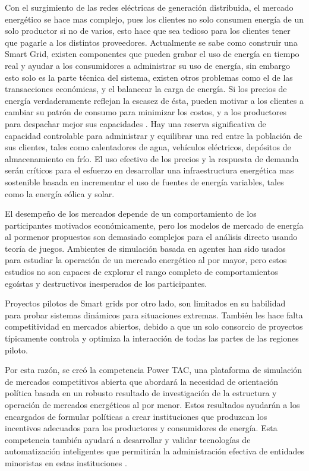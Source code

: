 Con el surgimiento de las redes eléctricas de generación distribuida, el mercado energético se hace mas complejo, pues los clientes no solo consumen energía de un solo productor si no de varios, esto hace que sea tedioso para los clientes tener que pagarle a los distintos proveedores.
Actualmente se sabe como construir una Smart Grid, existen componentes que pueden grabar el uso de energía en tiempo real y ayudar a los consumidores a administrar su uso de energía, sin embargo esto solo es la parte técnica del sistema, existen otros problemas como el de las transacciones económicas, y el balancear la carga de energía.
Si los precios de energía verdaderamente reflejan la escasez de ésta, pueden motivar a los clientes a cambiar su patrón de consumo para minimizar los costos, y a los productores para despachar mejor sus capacidades \cite{RetailElectricityCompetition}.
Hay una reserva significativa de capacidad controlable para administrar y equilibrar una red entre la población de sus clientes, tales como calentadores de agua, vehículos eléctricos, depósitos de almacenamiento en frío. 
El uso efectivo de los precios y la respuesta de demanda serán críticos para el esfuerzo en desarrollar una infraestructura energética mas sostenible basada en incrementar el uso de fuentes de energía variables, tales como la energía eólica y solar.

El desempeño de los mercados depende de un comportamiento de los participantes motivados económicamente, pero los modelos de mercado de energía al pormenor propuestos son demasiado complejos para el análisis directo usando teoría de juegos.
Ambientes de simulación basada en agentes han sido usados para estudiar la operación de un mercado energético al por mayor, pero estos estudios no son capaces de explorar el rango completo de comportamientos egoístas y destructivos inesperados de los participantes.

Proyectos pilotos de Smart grids por otro lado, son limitados en su habilidad para probar sistemas dinámicos para situaciones extremas. También les hace falta competitividad en mercados abiertos, debido a que un solo consorcio de proyectos típicamente controla y optimiza la interacción de todas las partes de las regiones piloto.

Por esta razón, se creó la competencia Power TAC, una plataforma de simulación de mercados competitivos abierta que abordará la necesidad de orientación política basada en un robusto resultado de investigación de la estructura y operación de mercados energéticos al por menor. Estos resultados ayudarán a los encargados de formular políticas a crear instituciones que produzcan los incentivos adecuados para los productores y consumidores de energía. 
Esta competencia también ayudará a desarrollar y validar tecnologías de automatización inteligentes que permitirán la administración efectiva de entidades minoristas en estas instituciones \cite{WKetterJCollinsyMdWeerdtThe2017PowerTAC}.

